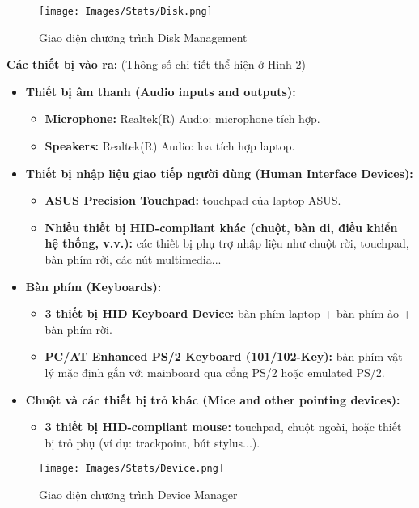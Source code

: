 \begin{figure}[H]
    \centering
    \texttt{[image: Images/Stats/Disk.png]}
    \caption{Giao diện chương trình Disk Management}
    \label{fig:cpu-z-disk}
\end{figure}

\noindent\textbf{\large Các thiết bị vào ra:} (Thông số chi tiết thể hiện ở Hình \ref{fig:cpu-z-device})

\begin{itemize}
        \item \textbf{Thiết bị âm thanh (Audio inputs and outputs):} 
        \begin{itemize}
            \item \textbf{Microphone:} Realtek(R) Audio: microphone tích hợp.
            \item \textbf{Speakers:} Realtek(R) Audio: loa tích hợp laptop.
        \end{itemize}
        \item \textbf{Thiết bị nhập liệu giao tiếp người dùng (Human Interface Devices):} 
        \begin{itemize}
            \item \textbf{ASUS Precision Touchpad:} touchpad của laptop ASUS.
            \item \textbf{Nhiều thiết bị HID-compliant khác (chuột, bàn di, điều khiển hệ thống, v.v.):} các thiết bị phụ trợ nhập liệu như chuột rời, touchpad, bàn phím rời, các nút multimedia...
        \end{itemize}
        \item \textbf{Bàn phím (Keyboards):}
        \begin{itemize}
            \item \textbf{3 thiết bị HID Keyboard Device:} bàn phím laptop + bàn phím ảo + bàn phím rời.
            \item \textbf{PC/AT Enhanced PS/2 Keyboard (101/102-Key):} bàn phím vật lý mặc định gắn với mainboard qua cổng PS/2 hoặc emulated PS/2.
        \end{itemize}
        \item \textbf{Chuột và các thiết bị trỏ khác (Mice and other pointing devices):}
        \begin{itemize}
            \item \textbf{3 thiết bị HID-compliant mouse:} touchpad, chuột ngoài, hoặc thiết bị trỏ phụ (ví dụ: trackpoint, bút stylus...).
        \end{itemize}
    \end{itemize}

\begin{center}
\end{center}

\begin{figure}[H]
    \centering
    \texttt{[image: Images/Stats/Device.png]}
    \caption{Giao diện chương trình Device Manager}
    \label{fig:cpu-z-device}
\end{figure}